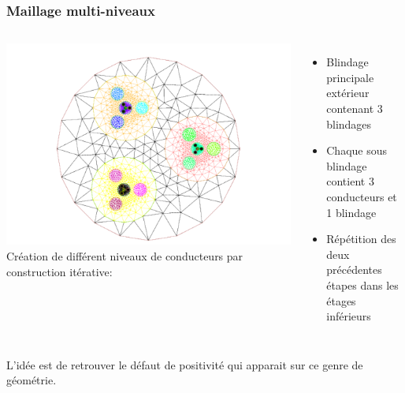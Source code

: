 \begin{frame}
    \frametitle{Maillage multi-niveaux}
    \begin{columns}[T]
        \centering
        \includegraphics[width=1.2\linewidth]{figures/gui/mesh-2.pdf}
        Création de différent niveaux de conducteurs par construction itérative:
        \begin{itemize}
            \item Blindage principale extérieur contenant 3 blindages
            \item Chaque sous blindage contient 3 conducteurs et 1 blindage
            \item Répétition des deux précédentes étapes dans les étages inférieurs
        \end{itemize}
    \end{columns}
    L'idée est de retrouver le défaut de positivité qui apparait sur ce genre de géométrie.
\end{frame}

